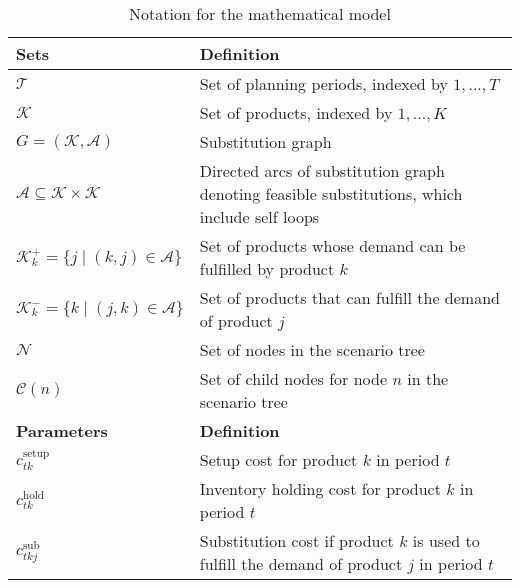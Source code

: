 \documentclass[10pt]{article}
\newcommand{\ti}{t} %
\newcommand{\TI}{\mathcal{T}}
\newcommand{\Ti}{T}
\newcommand{\ka}{k} %
\newcommand{\KA}{\mathcal{K}}
\newcommand{\Ka}{K}
\newcommand{\jey}{j} %
\newcommand{\Graf}{\mathcal{A}} %
\newcommand{\cn}{\mathcal{C}(n) }
\newcommand{\Csub}{\mathcal{K}^+_k}
\newcommand{\Psub}{\mathcal{K}^-_k}
\begin{document}


\begin{table}[H]
\centering
\caption{Notation for the mathematical model}
\begin{adjustbox}{width=1\textwidth,center=\textwidth}
\begin{tabular}{ll}
\toprule
{\textbf {Sets}} & {\textbf {Definition}} \\ \midrule
$\TI$  & Set of planning periods, indexed by $1, ... ,\Ti$ \\ 
$\KA$  & Set of products, indexed by $1, ... ,\Ka$ \\
$ G = (\KA,\mathcal{A})$  & Substitution graph \\
$ \Graf \subseteq \KA \times \KA$  & Directed arcs of substitution graph denoting feasible substitutions, which include self loops
\\
$  \Csub = \{\jey \mid (\ka,\jey) \in \Graf\}$  & Set of products whose demand can be fulfilled by product $\ka$  \\
$ \Psub = \{\ka \mid (\jey,\ka) \in \Graf\}$  & Set of products that can fulfill the demand of product $\jey$  \\
$ \mathcal{N} $  & Set of nodes in the scenario tree \\
$ \cn $  & Set of child nodes for node $n$ in the scenario tree \\
\midrule 
{\textbf {Parameters}} & {\textbf {Definition}} \\ \midrule
$c^{\text{setup}}_{\ti \ka}$ & Setup cost for product $\ka$ in period $\ti$ \\ 
$c^{\text{hold}}_{\ti \ka}$  & Inventory holding cost for product $k$ in period $\ti$  \\ 
$c^{\text{sub}}_{\ti \ka \jey }$  & Substitution cost if product $\ka$  is used to fulfill the demand of product $\jey$  in period $\ti$  \\ 

\end{tabular}
\end{adjustbox}
\end{table}
\end{document}
